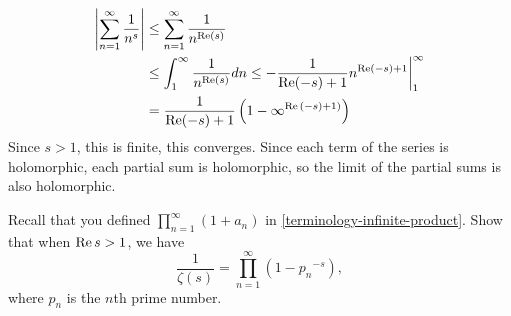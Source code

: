 \documentclass{homework}
\begin{document}
                                                                    \begin{solution}
                                                                    \begin{align*}
                                                                    \left|\sum_{n=1}^\infty \frac {1}{n^{s}}\right| &\leq \sum_{n=1}^\infty \frac {1}{n^{\operatorname{Re}(s)}} \\
                                                                    &\leq \int_1^\infty \frac{1}{n^{\operatorname{Re}(s)}}dn \leq -\frac{1}{\operatorname{Re}(-s)+1}n^{\operatorname{Re}(-s)+1}\bigg|_1^\infty \\
                                                                    &= \frac{1}{\operatorname{Re}(-s)+1}\left(1 - \infty^{\operatorname{Re}{(-s)+1)}}\right)
                                                                    \end{align*}
                                                                    Since $s>1$, this is finite, this converges. Since each term of the series is holomorphic, each partial sum is holomorphic, so the limit of the partial sums is also holomorphic.
                                                                    \end{solution}
                                                                    \begin{problem}\label{euler-product-formula}
                                                                    Recall that you defined
                                                                      \(\displaystyle\prod_{n=1}^\infty \left( 1 + a_n \right)\) in
                                                                        \ref{terminology-infinite-product}.  Show that when $\operatorname{Re} s > 1$, we
                                                                          have
                                                                            \[
                                                                                \frac{1}{\zeta(s)} = \displaystyle\prod_{n=1}^\infty \left( 1 - {p_n}^{-s} \right),
                                                                                  \]
                                                                                    where $p_n$ is the $n$th prime number.
                                                                                    \end{problem}
\end{document}
